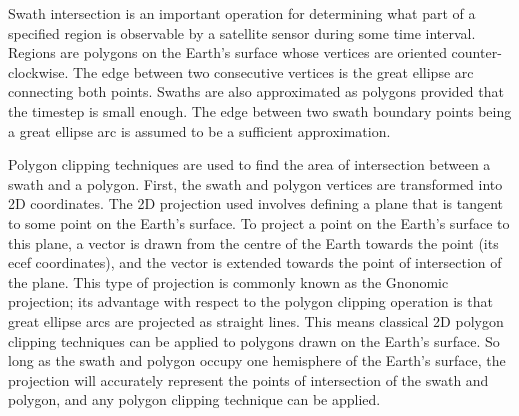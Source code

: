 Swath intersection is an important operation for determining what part of a
specified region is observable by a satellite sensor during some time interval.
Regions are polygons on the Earth’s surface whose vertices are oriented
counter-clockwise. The edge between two consecutive vertices is the great
ellipse arc connecting both points. Swaths are also approximated as polygons
provided that the timestep is small enough. The edge between two swath boundary
points being a great ellipse arc is assumed to be a sufficient approximation. 

Polygon clipping techniques are used to find the area of intersection between a
swath and a polygon. First, the swath and polygon vertices are transformed into
2D coordinates. The 2D projection used involves defining a plane that is
tangent to some point on the Earth’s surface. To project a point on the Earth’s
surface to this plane, a vector is drawn from the centre of the Earth towards
the point (its \gls{ecef} coordinates), and the vector is extended towards the
point of intersection of the plane. This type of projection is commonly known
as the Gnonomic projection; its advantage with respect to the polygon clipping
operation is that great ellipse arcs are projected as straight lines. This
means classical 2D polygon clipping techniques can be applied to polygons drawn
on the Earth’s surface. So long as the swath and polygon occupy one hemisphere
of the Earth’s surface, the projection will accurately represent the points of
intersection of the swath and polygon, and any polygon clipping technique can
be applied. 




